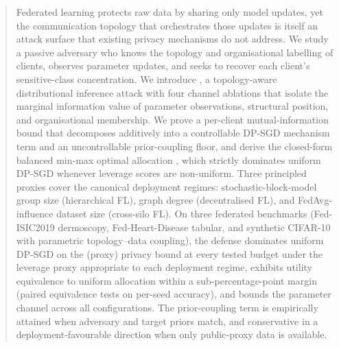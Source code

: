 \begin{abstract}
Federated learning protects raw data by sharing only model updates, yet the
communication topology that orchestrates those updates is itself an attack
surface that existing privacy mechanisms do not address. We study a passive
adversary who knows the topology and organisational labelling of clients,
observes parameter updates, and seeks to recover each client's sensitive-class
concentration. We introduce \TADI, a topology-aware distributional inference
attack with four channel ablations that isolate the marginal information value
of parameter observations, structural position, and organisational membership.
We prove a per-client mutual-information bound that decomposes additively into
a controllable \mbox{DP-SGD} mechanism term and an uncontrollable
prior-coupling floor, and derive the closed-form balanced min-max optimal
allocation \Fulcrum, which strictly dominates uniform \mbox{DP-SGD} whenever
leverage scores are non-uniform. Three principled proxies cover the canonical
deployment regimes: stochastic-block-model group size (hierarchical
\mbox{FL}), graph degree (decentralised \mbox{FL}), and
\mbox{FedAvg}-influence dataset size (cross-silo \mbox{FL}). On three
federated benchmarks (Fed-ISIC2019 dermoscopy, Fed-Heart-Disease tabular,
and synthetic \mbox{CIFAR-10} with parametric topology--data coupling), the
defense dominates uniform \mbox{DP-SGD} on the (proxy) privacy bound at every
tested budget under the leverage proxy appropriate to each deployment regime,
exhibits utility equivalence to uniform allocation within a sub-percentage-point
margin (paired equivalence tests on per-seed accuracy), and bounds the \TADI
parameter channel across all configurations.
The prior-coupling term is empirically attained when adversary and target
priors match, and conservative in a deployment-favourable direction when only
public-proxy data is available.
\end{abstract}

